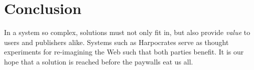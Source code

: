 \section{Conclusion}
In a system so complex, solutions must not only fit in, but also provide \textit{value} to users and publishers alike. Systems such as Harpocrates serve as thought experiments for re-imagining the Web such that both parties benefit. It is our hope that a solution is reached before the paywalls eat us all.